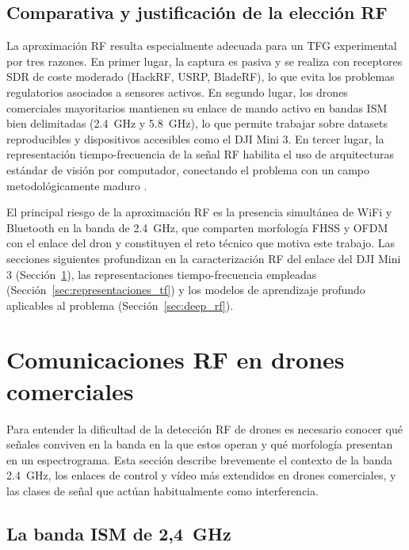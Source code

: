 \subsection{Comparativa y justificación de la elección RF}




La aproximación RF resulta especialmente adecuada para un TFG experimental por tres razones. En primer lugar, la captura es pasiva y se realiza con receptores SDR de coste moderado (HackRF, USRP, BladeRF), lo que evita los problemas regulatorios asociados a sensores activos. En segundo lugar, los drones comerciales mayoritarios mantienen su enlace de mando activo en bandas ISM bien delimitadas (\SI{2.4}{\giga\hertz} y \SI{5.8}{\giga\hertz}), lo que permite trabajar sobre datasets reproducibles y dispositivos accesibles como el DJI Mini 3. En tercer lugar, la representación tiempo-frecuencia de la señal RF habilita el uso de arquitecturas estándar de visión por computador, conectando el problema con un campo metodológicamente maduro \cite{rfuav2025,allahham2019dronerf}.

El principal riesgo de la aproximación RF es la presencia simultánea de WiFi y Bluetooth en la banda de \SI{2.4}{\giga\hertz}, que comparten morfología FHSS y OFDM con el enlace del dron y constituyen el reto técnico que motiva este trabajo. Las secciones siguientes profundizan en la caracterización RF del enlace del DJI Mini 3 (Sección~\ref{sec:comunicaciones_rf}), las representaciones tiempo-frecuencia empleadas (Sección~\ref{sec:representaciones_tf}) y los modelos de aprendizaje profundo aplicables al problema (Sección~\ref{sec:deep_rf}).


\section{Comunicaciones RF en drones comerciales}
\label{sec:comunicaciones_rf}

Para entender la dificultad de la detección RF de drones es necesario conocer qué señales conviven en la banda en la que estos operan y qué morfología presentan en un espectrograma. Esta sección describe brevemente el contexto de la banda \SI{2.4}{\giga\hertz}, los enlaces de control y vídeo más extendidos en drones comerciales, y las clases de señal que actúan habitualmente como interferencia.

\subsection{La banda ISM de 2,4~GHz}
\label{subsec:banda_ism}


